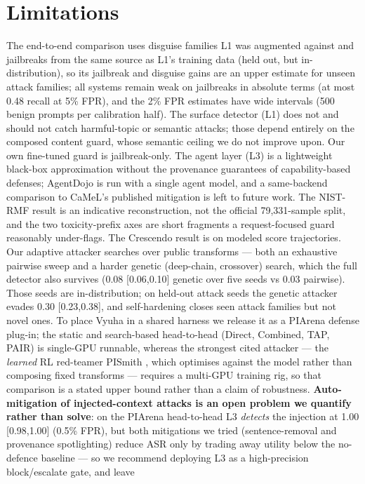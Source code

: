 \documentclass[11pt]{article}
\begin{document}
\section*{Limitations}
The end-to-end comparison uses disguise families L1 was augmented against and jailbreaks from the same
source as L1's training data (held out, but in-distribution), so its jailbreak and disguise gains are an
upper estimate for unseen attack families; all systems remain weak on jailbreaks in absolute terms
(at most 0.48 recall at 5\% FPR), and the 2\% FPR estimates have wide intervals (500 benign prompts per
calibration half). The surface detector (L1) does not and should not catch harmful-topic or semantic attacks; those
depend entirely on the composed content guard, whose semantic ceiling we do not improve upon. Our own
fine-tuned guard is jailbreak-only. The agent layer (L3) is a lightweight black-box approximation
without the provenance guarantees of capability-based defenses; AgentDojo is run with a single agent model,
and a same-backend comparison to CaMeL's published mitigation is left to future work.
The NIST-RMF result is an indicative reconstruction, not the official 79{,}331-sample split, and the
two toxicity-prefix axes are short fragments a request-focused guard reasonably under-flags. The
Crescendo result is on modeled score trajectories. Our adaptive attacker searches over
public transforms --- both an exhaustive pairwise sweep and a harder genetic (deep-chain, crossover)
search, which the full detector also survives (0.08 [0.06,0.10] genetic over five seeds vs 0.03 pairwise). Those seeds are in-distribution; on held-out
attack seeds the genetic attacker evades 0.30 [0.23,0.38], and self-hardening closes seen attack families
but not novel ones. To place Vyuha in
a shared harness we release it as a PIArena \citep{piarena} defense plug-in; the static and
search-based head-to-head (Direct, Combined, TAP, PAIR) is single-GPU runnable, whereas the strongest
cited attacker --- the \emph{learned} RL red-teamer PISmith \citep{pismith}, which optimises against
the model rather than composing fixed transforms --- requires a multi-GPU training rig, so that
comparison is a stated upper bound rather than a claim of robustness. \textbf{Auto-mitigation of
injected-context attacks is an open problem we quantify rather than solve}: on the PIArena head-to-head
L3 \emph{detects} the injection at 1.00 [0.98,1.00] (0.5\% FPR), but both mitigations we tried
(sentence-removal and provenance spotlighting) reduce ASR only by trading away utility below the
no-defence baseline --- so we recommend deploying L3 as a high-precision block/escalate gate, and leave
\end{document}
